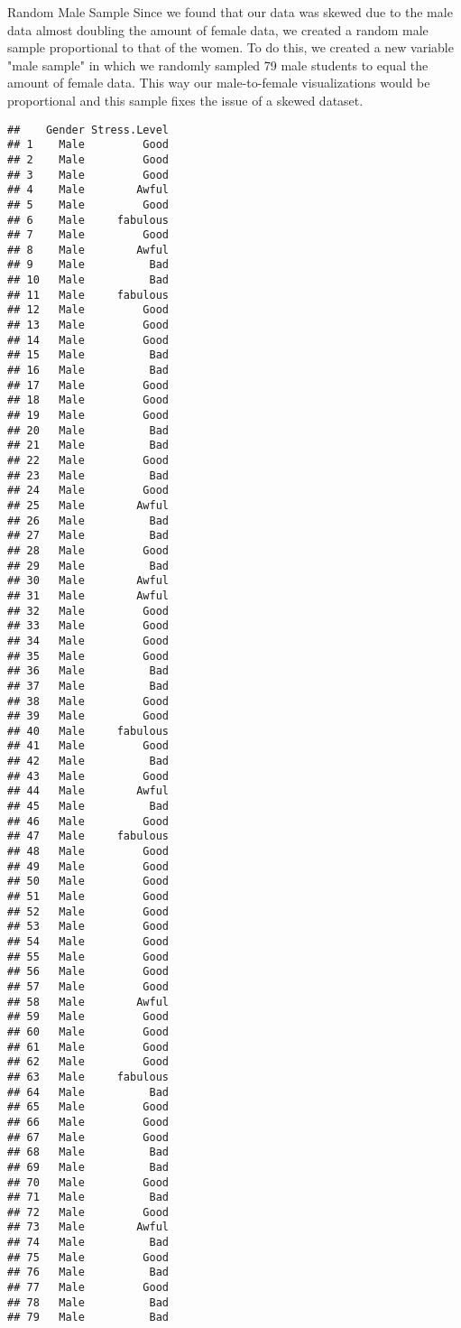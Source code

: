 \documentclass[
  ignorenonframetext,
]{beamer}
\begin{document}
\begin{frame}[fragile]{Random Male Sample}
\protect\hypertarget{random-male-sample}{}
Since we found that our data was skewed due to the male data almost
doubling the amount of female data, we created a random male sample
proportional to that of the women. To do this, we created a new variable
"male sample" in which we randomly sampled 79 male students to equal the
amount of female data. This way our male-to-female visualizations would
be proportional and this sample fixes the issue of a skewed dataset.

\begin{verbatim}
##    Gender Stress.Level
## 1    Male         Good
## 2    Male         Good
## 3    Male         Good
## 4    Male        Awful
## 5    Male         Good
## 6    Male     fabulous
## 7    Male         Good
## 8    Male        Awful
## 9    Male          Bad
## 10   Male          Bad
## 11   Male     fabulous
## 12   Male         Good
## 13   Male         Good
## 14   Male         Good
## 15   Male          Bad
## 16   Male          Bad
## 17   Male         Good
## 18   Male         Good
## 19   Male         Good
## 20   Male          Bad
## 21   Male          Bad
## 22   Male         Good
## 23   Male          Bad
## 24   Male         Good
## 25   Male        Awful
## 26   Male          Bad
## 27   Male          Bad
## 28   Male         Good
## 29   Male          Bad
## 30   Male        Awful
## 31   Male        Awful
## 32   Male         Good
## 33   Male         Good
## 34   Male         Good
## 35   Male         Good
## 36   Male          Bad
## 37   Male          Bad
## 38   Male         Good
## 39   Male         Good
## 40   Male     fabulous
## 41   Male         Good
## 42   Male          Bad
## 43   Male         Good
## 44   Male        Awful
## 45   Male          Bad
## 46   Male         Good
## 47   Male     fabulous
## 48   Male         Good
## 49   Male         Good
## 50   Male         Good
## 51   Male         Good
## 52   Male         Good
## 53   Male         Good
## 54   Male         Good
## 55   Male         Good
## 56   Male         Good
## 57   Male         Good
## 58   Male        Awful
## 59   Male         Good
## 60   Male         Good
## 61   Male         Good
## 62   Male         Good
## 63   Male     fabulous
## 64   Male          Bad
## 65   Male         Good
## 66   Male         Good
## 67   Male         Good
## 68   Male          Bad
## 69   Male          Bad
## 70   Male         Good
## 71   Male          Bad
## 72   Male         Good
## 73   Male        Awful
## 74   Male          Bad
## 75   Male         Good
## 76   Male          Bad
## 77   Male         Good
## 78   Male          Bad
## 79   Male          Bad
\end{verbatim}
\end{frame}
\end{document}
